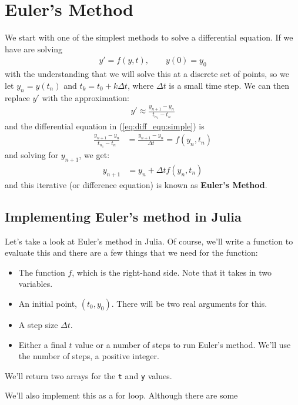 \section{Euler's Method}

We start with one of the simplest methods to solve a differential equation.  If we have are solving
\begin{align}
y' = f(y,t), \qquad y(0) = y_0 \label{eq:diff_eqn:simple}
\end{align}
%
with the understanding that we will solve this at a discrete set of points, so we let $y_n = y(t_n)$ and $t_k = t_0 + k\Delta t$, where $\Delta t$ is a small time step.  We can then replace $y'$ with the approximation:
\begin{align*}
y' \approx \frac{y_{n+1}-y_n}{t_{n_1}-t_n} 
\end{align*}
and the differential equation in (\ref{eq:diff_eqn:simple}) is 
\begin{align*}
\frac{y_{n+1}-y_n}{t_{n_1}-t_n} & = \frac{y_{n+1}-y_n}{\Delta t} = f(y_n,t_n)
\end{align*}
and solving for $y_{n+1}$, we get:
\begin{align*}
y_{n+1} & = y_n + \Delta t f(y_n,t_n)
\end{align*}
and this iterative (or difference equation) is known as \textbf{Euler's Method}.  

\subsection{Implementing Euler's method in Julia}

Let's take a look at Euler's method in Julia. Of course, we'll write a function to evaluate this and there are a few things that we need for the function:
\begin{itemize}
\item The function $f$, which is the right-hand side.  Note that it takes in two variables. 
\item An initial point, $(t_0,y_0)$.  There will be two real arguments for this. 
\item A step size $\Delta t$.  
\item Either a final $t$ value or a number of steps to run Euler's method.  We'll use the number of steps, a positive integer.  
\end{itemize}

We'll return two arrays for the \verb!t! and \verb!y! values. 

We'll also implement this as a for loop.  Although there are some 


